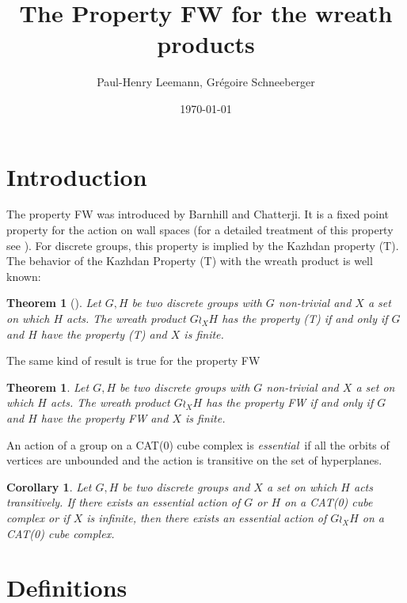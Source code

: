\documentclass[a4paper]{article}
\title{The Property FW for the wreath products}
\author{Paul-Henry Leemann, Grégoire Schneeberger}
\date{\today \quad \currenttime}
\newtheorem{cor}[lem]{Corollary}
\newtheorem{thm}[lem]{Theorem}
\theoremstyle{definition}
\theoremstyle{remark}%
\begin{document}
\maketitle

\section{Introduction}
%
The property FW was introduced by Barnhill and Chatterji. It is a fixed point property for the action on wall spaces (for a detailed treatment of this property see \cite{Cornulier2013}). For discrete groups, this property is implied by the Kazhdan property (T). The behavior of the Kazhdan Property (T) with the wreath product is well known: 
\begin{thm}[\cite{Cherix2004,Neuhauser2005a}] \label{T:Wreath_prop_T}
Let $G,H$ be two discrete groups with $G$ non-trivial and $X$ a set on which $H$ acts. The wreath product $G \wr_X H$ has the property (T) if and only if $G$ and $H$ have the property (T) and $X$ is finite.
\end{thm}
%
%
The same kind of result is true for the property FW
\begin{thm}\label{Thm:Main}
Let $G,H$ be two discrete groups with $G$ non-trivial and $X$ a set on which $H$ acts. The wreath product $G \wr_X H$ has the property FW if and only if $G$ and $H$ have the property FW and $X$ is finite.\end{thm}
%
%
An action of a group on a CAT(0) cube complex is \emph{essential} if all the orbits of vertices are unbounded and the action is transitive on the set of hyperplanes.
\begin{cor}
Let $G,H$ be two discrete groups and $X$ a set on which $H$ acts transitively. If there exists an essential action of $G$ or $H$ on a CAT(0) cube complex  or if $X$ is infinite, then there exists an essential action of $G \wr_X H$ on a CAT(0) cube complex. 
\end{cor}
%
%

%
%
\section{Definitions}
\end{document}
